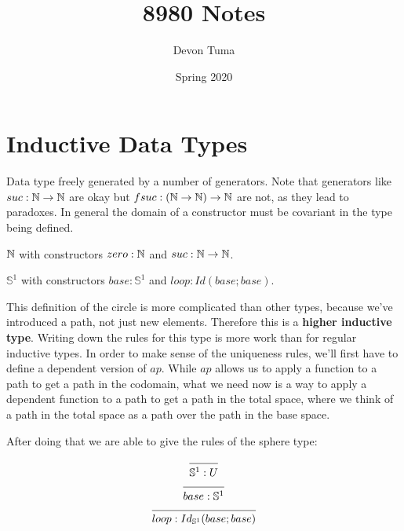 \documentclass[11pt]{article}
\title{8980 Notes}
\author{Devon Tuma}
\date{Spring 2020}
\begin{document}
\maketitle

\section*{Inductive Data Types}

\begin{definition}
  Data type freely generated by a number of generators. Note that generators like $suc : \mathbb{N} \rightarrow \mathbb{N}$ are okay but $fsuc : (\mathbb{N} \rightarrow \mathbb{N}) \rightarrow \mathbb{N}$ are not, as they lead to paradoxes.
  In general the domain of a constructor must be covariant in the type being defined.
\end{definition}

\begin{example}
  $\mathbb{N}$ with constructors $zero : \mathbb{N}$ and $suc : \mathbb{N} \rightarrow \mathbb{N}$. 
\end{example}

\begin{example}
  $\mathbb{S}^1$ with constructors $base : \mathbb{S}^1$ and $loop : Id(base ; base)$.
\end{example}

This definition of the circle is more complicated than other types, because we've introduced a path, not just new elements.
Therefore this is a \textbf{higher inductive type}.
Writing down the rules for this type is more work than for regular inductive types.
In order to make sense of the uniqueness rules, we'll first have to define a dependent version of $ap$.
While $ap$ allows us to apply a function to a path to get a path in the codomain, what we need now is a way to apply a dependent function to a path to get a path in the total space, where we think of a path in the total space as a path over the path in the base space.


After doing that we are able to give the rules of the sphere type:

\begin{multicols}{3}
  \noindent
  \begin{equation*}
    \begin{prooftree}
      \infer0[] {
        \mathbb{S}^1 : U
      }
    \end{prooftree}
  \end{equation*}
  \begin{equation*}
    \begin{prooftree}
      \infer0[] {
        base : \mathbb{S}^1
      }
    \end{prooftree}
  \end{equation*}
  \begin{equation*}
    \begin{prooftree}
      \infer0[] {
        loop : Id_{\mathbb{S}^1}(base; base)
      }
    \end{prooftree}
  \end{equation*}
\end{multicols}
\end{document}
